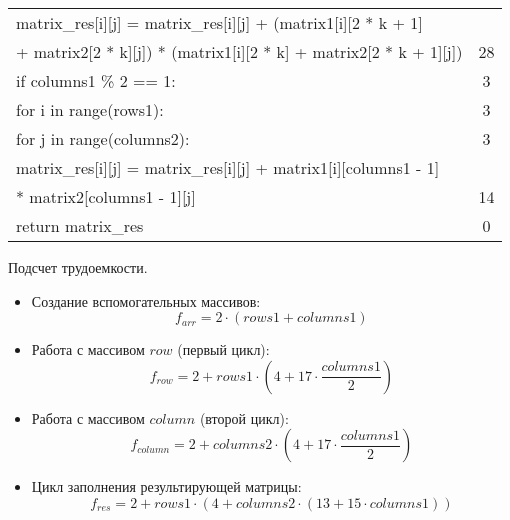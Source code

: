 \begin{itemize}
\begin{table}[h]
\begin{center}
\begin{threeparttable}
\begin{tabular}{|l|c|}
            \hline
            matrix\_res[i][j] = matrix\_res[i][j] + (matrix1[i][2 * k + 1] & \\ + matrix2[2 * k][j]) * (matrix1[i][2 * k] + matrix2[2 * k + 1][j]) & 28 \\ 
            \hline
            if columns1 \% 2 == 1: & 3 \\ 
            \hline
            for i in range(rows1): & 3 \\ 
            \hline
            for j in range(columns2): & 3\\ 
            \hline
            matrix\_res[i][j] = matrix\_res[i][j] + matrix1[i][columns1 - 1] & \\ * matrix2[columns1 - 1][j] & 14 \\ 
            \hline
            return matrix\_res & 0 \\ 
            \hline
		\end{tabular}
        \end{threeparttable}
    \end{center}
    \end{table}

    \FloatBarrier
    
    Подсчет трудоемкости.
    
    \begin{itemize}
        \item Создание вспомогательных массивов: 
        \begin{equation}
            f_{arr} = 2 \cdot (rows1 + columns1)
        \end{equation}
        
        \item Работа с массивом $row$ (первый цикл):
        \begin{equation}
            f_{row} = 2 + rows1 \cdot (4 + 17 \cdot \frac{columns1}{2})
        \end{equation}
        
        \item Работа с массивом $column$ (второй цикл):
        \begin{equation}
            f_{column} = 2 + columns2 \cdot (4 + 17 \cdot \frac{columns1}{2})
        \end{equation}
        
        \item Цикл заполнения результирующей матрицы: 
        \begin{equation}
            f_{res} = 2 + rows1 \cdot (4 + columns2 \cdot (13 + 15 \cdot columns1))
        \end{equation}
        

\end{itemize}
\end{itemize}
